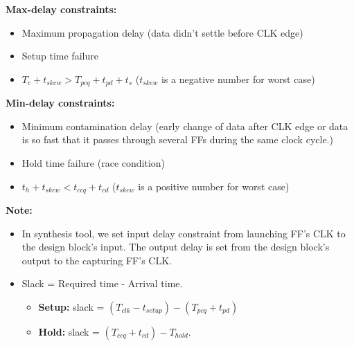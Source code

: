 \documentclass[11pt]{article}
\begin{document}
    \textbf{Max-delay constraints:}
    \begin{itemize}
        \item Maximum propagation delay (data didn't settle before CLK edge)
        \item Setup time failure
        \item $T_c + t_{skew}> T_{pcq} + t_{pd} + t_s$ ($t_{skew}$ is a negative number for worst case)
    \end{itemize}
    \textbf{Min-delay constraints:}
    \begin{itemize}
        \item Minimum contamination delay (early change of data after CLK edge or data is so fast that it passes through
        several FFs during the same clock cycle.)
        \item Hold time failure (race condition)
        \item $t_h + t_{skew} < t_{ccq} + t_{cd}$ ($t_{skew}$ is a positive number for worst case)
    \end{itemize}
    \textbf{Note:} 
    \begin{itemize}
        \item In synthesis tool, we set input delay constraint from launching FF's CLK to the design block's input. The output delay is set from the design block's output to the capturing FF's CLK.
        \item Slack = Required time - Arrival time. 
        \begin{itemize}
            \item \textbf{Setup:} slack = $(T_{clk} - t_{setup}) - (T_{pcq} + t_{pd})$
            \item \textbf{Hold:} slack = $(T_{ccq} + t_{cd}) - T_{hold}$.
        \end{itemize} 
    \end{itemize}
\end{document}
